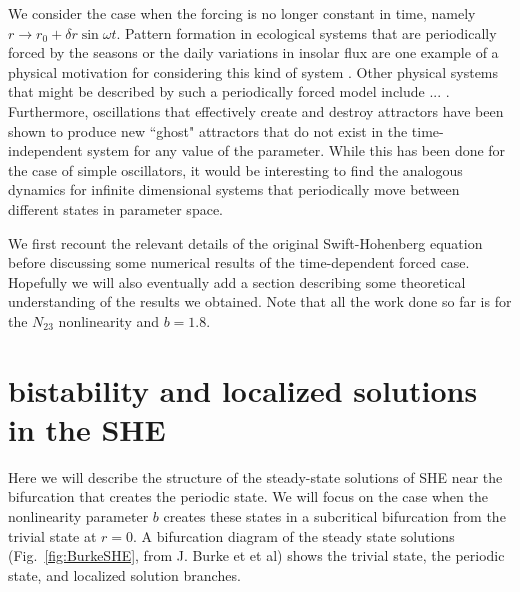 \documentclass[pre,preprint,superscriptaddress]{revtex4-1}
\begin{document}
We consider the case when the forcing is no longer constant in time, namely $r\rightarrow r_0+\delta r \sin\omega t$.  Pattern formation in ecological systems that are periodically forced by the seasons or the daily variations in insolar flux are one example of a physical motivation for considering this kind of system \cite{}.  Other physical systems that might be described by such a periodically forced model include ... \cite{}.   Furthermore, oscillations that effectively create and destroy attractors have been shown to produce new ``ghost" attractors that do not exist in the time-independent system for any value of the parameter\cite{}.  While this has been done for the case of simple oscillators, it would be interesting to find the analogous dynamics for infinite dimensional systems that periodically move between different states in parameter space.

We first recount the relevant details of the original Swift-Hohenberg equation before discussing some numerical results of the time-dependent forced case.  Hopefully we will also eventually add a section describing some theoretical understanding of the results we obtained.  Note that all the work done so far is for the $N_{23}$ nonlinearity and $b=1.8$.


\section{bistability and localized solutions in the SHE}
Here we will describe the structure of the steady-state solutions of SHE near the bifurcation that creates the periodic state.  We will focus on the case when the nonlinearity parameter $b$ creates these states in a subcritical bifurcation from the trivial state at $r=0$.  A bifurcation diagram of the steady state solutions (Fig.~\ref{fig:BurkeSHE}, from J. Burke et et al) shows the trivial state, the periodic state, and localized solution branches.  
\end{document}
